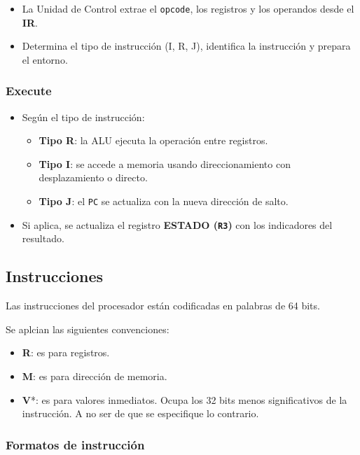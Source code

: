 \documentclass{article}
\begin{document}
\begin{itemize}
  \item La Unidad de Control extrae el \texttt{opcode}, los registros y los operandos desde el \textbf{IR}.
  \item Determina el tipo de instrucción (I, R, J), identifica la instrucción y prepara el entorno.
\end{itemize}

\subsubsection{Execute}

\begin{itemize}
  \item Según el tipo de instrucción:
        \begin{itemize}
          \item \textbf{Tipo R}: la ALU ejecuta la operación entre registros.
          \item \textbf{Tipo I}: se accede a memoria usando direccionamiento con desplazamiento o directo.
          \item \textbf{Tipo J}: el \texttt{PC} se actualiza con la nueva dirección de salto.
        \end{itemize}
  \item Si aplica, se actualiza el registro \textbf{ESTADO (\texttt{R3})} con los indicadores del resultado.
\end{itemize}



\subsection{Instrucciones}

Las instrucciones del procesador están codificadas 
en palabras de 64 bits.

Se aplcian las siguientes convenciones:
\begin{itemize}
  \item \textbf{R}: es para registros.
  \item \textbf{M}: es para dirección de memoria.
  \item \textbf{V}*: es para valores inmediatos. 
        Ocupa los 32 bits menos significativos de la instrucción. 
        A no ser
        de que se especifique lo contrario.
\end{itemize}

\subsubsection{Formatos de instrucción}
\end{document}
